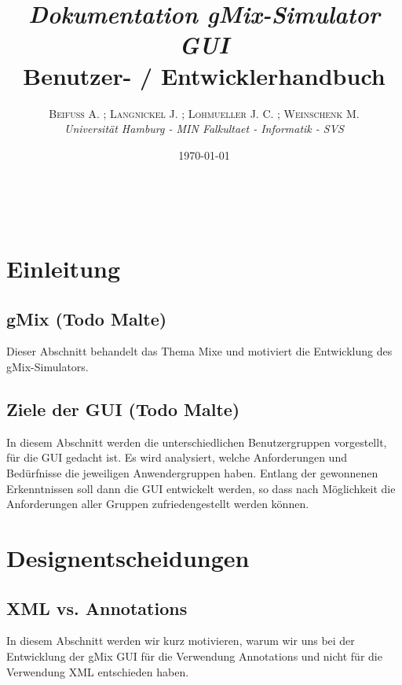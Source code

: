 \documentclass[a4paper, 11pt]{article} %
\title{\emph{Dokumentation gMix-Simulator GUI}\\ %
Benutzer- / Entwicklerhandbuch} %
\author{\textsc{Beifuß A. ; Langnickel J. ; Lohmueller J. C. ; Weinschenk M.} %
\\{\textit{Universität Hamburg - MIN Falkultaet - Informatik - SVS}}} %
\date{\today} %
\makeatletter
\renewcommand{\maketitle}{ %
\begin{flushright} %
{\LARGE\@title} %

\vspace{50pt} %

{\large\@author} %
\\\@date %

\vspace{40pt} %
\end{flushright}
}
\makeatother
\begin{document}
\maketitle %

 


\tableofcontents


\vspace{30pt} %

\section{Einleitung} %
\label{sec:einleitung}

\subsection{gMix (Todo Malte)} %
\label{sub:gmix}
Dieser Abschnitt behandelt das Thema Mixe und motiviert die Entwicklung des gMix-Simulators.

\subsection{Ziele der GUI (Todo Malte)} %
\label{sub:ziele_der_gui}
In diesem Abschnitt werden die unterschiedlichen Benutzergruppen vorgestellt, für die GUI gedacht ist. Es wird analysiert, welche Anforderungen und Bedürfnisse die jeweiligen Anwendergruppen haben. Entlang der gewonnenen Erkenntnissen soll dann die GUI entwickelt werden, so dass nach Möglichkeit die Anforderungen aller Gruppen zufriedengestellt werden können.

\newpage
\section{Designentscheidungen} %
\label{sec:designentscheidungen}

\subsection{XML vs. Annotations} %
\label{sub:xml}
In diesem Abschnitt werden wir kurz motivieren, warum wir uns bei der Entwicklung der gMix GUI für die Verwendung Annotations und nicht für die Verwendung XML entschieden haben.\\
\end{document}

